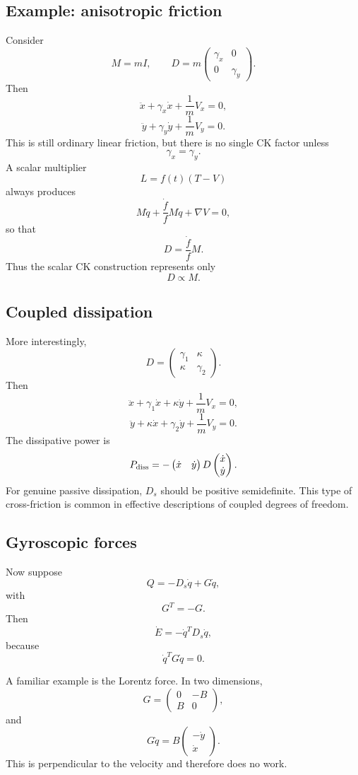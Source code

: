 \subsection{Example: anisotropic friction}
Consider
$$M=mI,\qquad D= m \begin{pmatrix} \gamma_x&0\\ 0&\gamma_y \end{pmatrix}.$$
Then
$$ \ddot x+\gamma_x\dot x+\frac{1}{m}V_x=0, $$ $$ \ddot y+\gamma_y\dot y+\frac{1}{m}V_y=0. $$
This is still ordinary linear friction, but there is no single CK factor unless $$ \gamma_x=\gamma_y. $$ A scalar multiplier $$ L=f(t)(T-V) $$
always produces $$ M\ddot q+\frac{\dot f}{f}M\dot q+\nabla V=0, $$
so that $$ D=\frac{\dot f}{f}M. $$
Thus the scalar CK construction represents only
$$ \boxed{D\propto M.} $$

\subsection{Coupled dissipation}
More interestingly,
$$ D= \begin{pmatrix} \gamma_1&\kappa\\ \kappa&\gamma_2 \end{pmatrix}. $$
Then
$$ \ddot x+\gamma_1\dot x+\kappa\dot y+\frac1mV_x=0, $$ $$ \ddot y+\kappa\dot x+\gamma_2\dot y+\frac1mV_y=0. $$
The dissipative power is
$$ P_{\rm diss} = -\begin{pmatrix}\dot x&\dot y\end{pmatrix} D \begin{pmatrix}\dot x\\\dot y\end{pmatrix}. $$
For genuine passive dissipation, \(D_s\) should be positive semidefinite.
This type of cross-friction is common in effective descriptions of coupled degrees of freedom.

\subsection{Gyroscopic forces}
Now suppose $$ Q=-D_s\dot q+G\dot q, $$ with $$ G^T=-G. $$
Then $$ \dot E=-\dot q^TD_s\dot q, $$
because $$ \dot q^TG\dot q=0. $$

A familiar example is the Lorentz force. In two dimensions,
$$ G= \begin{pmatrix} 0&-B\\ B&0 \end{pmatrix}, $$
and
$$ G\dot q = B \begin{pmatrix} -\dot y\\ \dot x \end{pmatrix}. $$
This is perpendicular to the velocity and therefore does no work.

